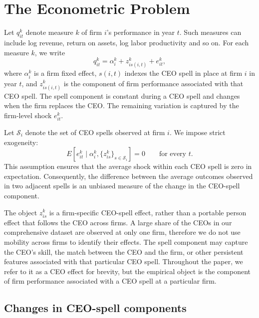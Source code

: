 \documentclass[11pt,a4paper]{article}
\begin{document}
\section{The Econometric Problem}\label{sec:econometric_problem}

Let $q_{it}^{k}$ denote measure $k$ of firm $i$'s performance in year
$t$. Such measures can include log
revenue, return on assets, log labor productivity and so on. For each measure
$k$, we write
\begin{equation}
q_{it}^{k}
=
\alpha_i^{k}
+
z_{is(i,t)}^{k}
+
e_{it}^{k},
\label{eq:outcome_model}
\end{equation}
where $\alpha_i^{k}$ is a firm fixed effect, $s(i,t)$ indexes the CEO
spell in place at firm $i$ in year $t$, and $z_{is(i,t)}^{k}$ is the
component of firm performance associated with that CEO spell. The spell component is constant during a CEO spell and changes when the firm replaces the CEO. The remaining variation is captured by the firm-level
shock $e_{it}^{k}$.

Let $\mathcal S_i$ denote the set of CEO spells observed at firm $i$.
We impose strict exogeneity:
\begin{equation}
E\!\left[
e_{it}^{k}
\mid
\alpha_i^{k},
\{z_{is}^{k}\}_{s\in\mathcal S_i}
\right]
=
0
\qquad
\text{for every }t.
\label{eq:strict_exogeneity}
\end{equation}
This assumption ensures that the average shock within each CEO spell is
zero in expectation. Consequently, the difference between the average
outcomes observed in two adjacent spells is an unbiased measure of the
change in the CEO-spell component.

The object $z_{is}^{k}$ is a firm-specific CEO-spell effect, rather than
a portable person effect that follows the CEO across firms. A large share of the CEOs
in our comprehensive dataset are observed at only one firm, therefore we do not use mobility
across firms to identify their effects. The spell component may capture
the CEO's skill, the match between the CEO and the firm, or other
persistent features associated with that particular CEO spell.
Throughout the paper, we refer to it as a CEO effect for
brevity, but the empirical object is the component of firm performance
associated with a CEO spell at a particular firm.

\subsection{Changes in CEO-spell components}\label{subsec:spell_changes}
\end{document}
